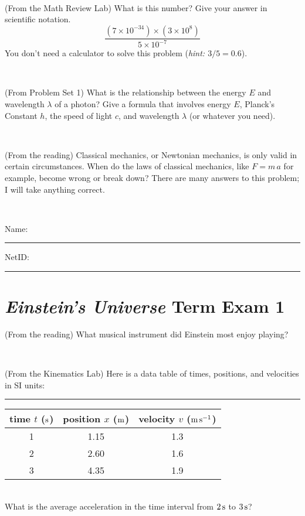 \documentclass[12pt, letterpaper]{article}
\begin{document}
\vfill ~

\begin{problem} (From the Math Review Lab)
What is this number? Give your answer in scientific notation.
$$
\frac{(7\times10^{-34})\times(3\times10^8)}{5\times10^{-7}}
$$
You don't need a calculator to solve this problem (\textit{hint: $3/5=0.6$}).
\end{problem}


\vfill ~

\begin{problem} (From Problem Set 1)
What is the relationship between the energy $E$ and wavelength
$\lambda$ of a photon? Give a formula that involves energy $E$,
Planck's Constant $h$, the speed of light $c$, and wavelength
$\lambda$ (or whatever you need).
\end{problem}

\vfill ~

\begin{problem} (From the reading)
Classical mechanics, or Newtonian mechanics, is only valid in certain
circumstances. When do the laws of classical mechanics, like $F =
m\,a$ for example, become wrong or break down? There are many answers
to this problem; I will take anything correct.
\end{problem}


\vfill ~


\cleardoublepage



\noindent
Name: \rule[-1ex]{0.60\textwidth}{0.1pt}
NetID: \rule[-1ex]{0.20\textwidth}{0.1pt}

\section*{\textsl{Einstein's Universe} Term Exam 1}
\setcounter{problem}{1}


\begin{problem} (From the reading)
What musical instrument did Einstein most enjoy playing?
\end{problem}


\vfill ~

\begin{problem} (From the Kinematics Lab)
Here is a data table of times, positions, and velocities in SI units:\\
\rule{1.0in}{0pt}\begin{tabular}{c|c|c}
time $t$ ($\mathrm{s}$) & position $x$ ($\mathrm{m}$) & velocity $v$ ($\mathrm{m}\,\mathrm{s}^{-1}$) \\
\hline
1 & 1.15 & 1.3 \\
2 & 2.60 & 1.6 \\
3 & 4.35 & 1.9 \\
\hline
\end{tabular}\\
What is the average acceleration in the time interval from $2\,\mathrm{s}$ to $3\,\mathrm{s}$?
\end{problem}
\end{document}
